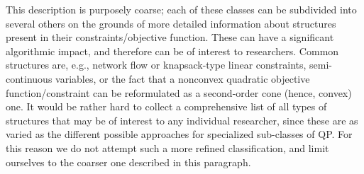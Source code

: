 %
This description is purposely coarse; each of these classes can be subdivided into several others on the grounds of more detailed information about structures present in their constraints/objective function. These can have a significant algorithmic impact, and therefore can be of interest to researchers. Common structures are, e.g., network flow or knapsack-type linear constraints, semi-continuous variables, or the fact that a nonconvex quadratic objective function/constraint can be reformulated as a second-order cone (hence, convex) one. It would be rather hard to collect a comprehensive list of all types of structures that may be of interest to any individual researcher, since these are as varied as the different possible approaches for specialized sub-classes of QP. For this reason we do not attempt such a more refined classification, and limit ourselves to the coarser one described in this paragraph.

